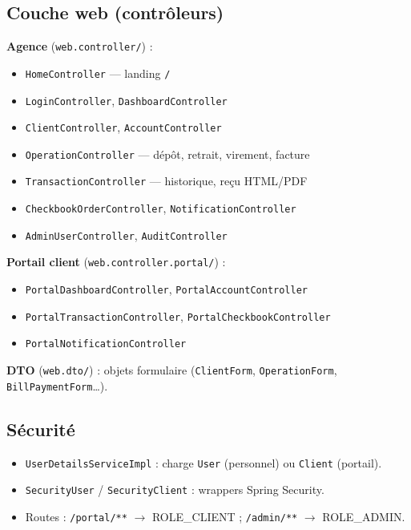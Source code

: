 \subsection{Couche web (contrôleurs)}

\textbf{Agence} (\texttt{web.controller/}) :
\begin{itemize}[leftmargin=*]
    \item \texttt{HomeController} — landing \texttt{/}
    \item \texttt{LoginController}, \texttt{DashboardController}
    \item \texttt{ClientController}, \texttt{AccountController}
    \item \texttt{OperationController} — dépôt, retrait, virement, facture
    \item \texttt{TransactionController} — historique, reçu HTML/PDF
    \item \texttt{CheckbookOrderController}, \texttt{NotificationController}
    \item \texttt{AdminUserController}, \texttt{AuditController}
\end{itemize}

\textbf{Portail client} (\texttt{web.controller.portal/}) :
\begin{itemize}[leftmargin=*]
    \item \texttt{PortalDashboardController}, \texttt{PortalAccountController}
    \item \texttt{PortalTransactionController}, \texttt{PortalCheckbookController}
    \item \texttt{PortalNotificationController}
\end{itemize}

\textbf{DTO} (\texttt{web.dto/}) : objets formulaire (\texttt{ClientForm}, \texttt{OperationForm}, \texttt{BillPaymentForm}…).

\subsection{Sécurité}

\begin{itemize}[leftmargin=*]
    \item \texttt{UserDetailsServiceImpl} : charge \texttt{User} (personnel) ou \texttt{Client} (portail).
    \item \texttt{SecurityUser} / \texttt{SecurityClient} : wrappers Spring Security.
    \item Routes : \texttt{/portal/**} $\rightarrow$ ROLE\_CLIENT ; \texttt{/admin/**} $\rightarrow$ ROLE\_ADMIN.
\end{itemize}

